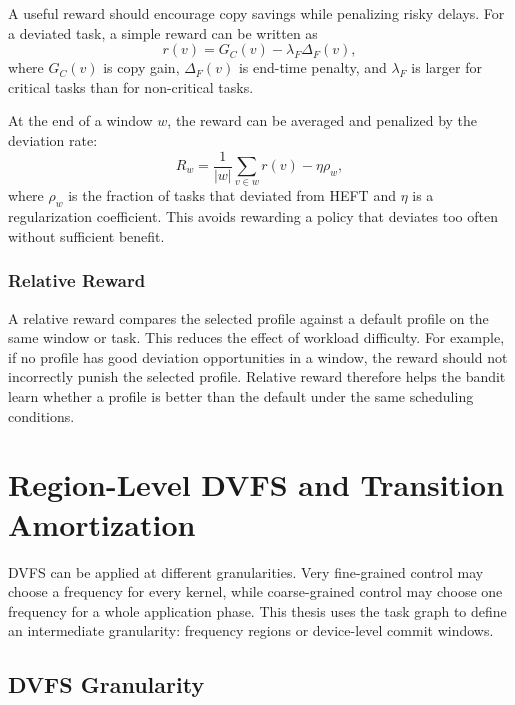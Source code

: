 A useful reward should encourage copy savings while penalizing risky delays. For a deviated task, a simple reward can be written as
\begin{equation}
r(v) = G_C(v) - \lambda_F \Delta_F(v),
\label{eq:task_reward}
\end{equation}
where $G_C(v)$ is copy gain, $\Delta_F(v)$ is end-time penalty, and $\lambda_F$ is larger for critical tasks than for non-critical tasks.

At the end of a window $w$, the reward can be averaged and penalized by the deviation rate:
\begin{equation}
R_w = \frac{1}{|w|}\sum_{v \in w} r(v) - \eta \rho_w,
\label{eq:window_reward}
\end{equation}
where $\rho_w$ is the fraction of tasks that deviated from HEFT and $\eta$ is a regularization coefficient. This avoids rewarding a policy that deviates too often without sufficient benefit.

\subsubsection{Relative Reward}
\label{subsubsec:relative_reward}

A relative reward compares the selected profile against a default profile on the same window or task. This reduces the effect of workload difficulty. For example, if no profile has good deviation opportunities in a window, the reward should not incorrectly punish the selected profile. Relative reward therefore helps the bandit learn whether a profile is better than the default under the same scheduling conditions.

\section{Region-Level DVFS and Transition Amortization}
\label{sec:theory_region_dvfs}

DVFS can be applied at different granularities. Very fine-grained control may choose a frequency for every kernel, while coarse-grained control may choose one frequency for a whole application phase. This thesis uses the task graph to define an intermediate granularity: frequency regions or device-level commit windows.

\subsection{DVFS Granularity}
\label{subsec:dvfs_granularity}

